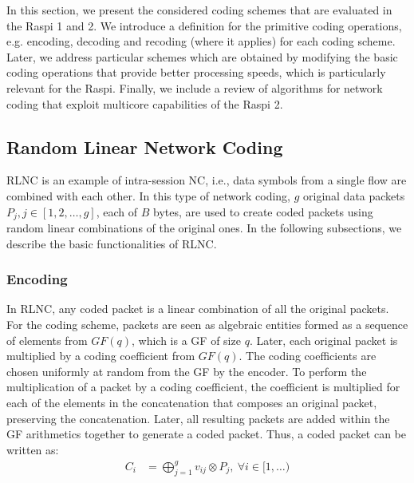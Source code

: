 \label{sec:schemes}

In this section, we present the considered coding schemes that are evaluated
in the \ac{Raspi} 1 and 2.
We introduce a
definition for the primitive coding operations, e.g. encoding,
decoding and recoding (where it applies) for each coding
scheme. Later, we address particular schemes which are obtained by
modifying the basic coding operations that provide better processing
speeds, which is particularly relevant for the \ac{Raspi}.  Finally,
we include a review of algorithms for network coding that exploit
multicore capabilities of the \ac{Raspi} 2.


\subsection{Random Linear Network Coding}
\label{ssec:RLNC}

\ac{RLNC} is an example of intra-session \ac{NC}, i.e., data symbols
from a single flow are combined with each other. In this type of
network coding, $g$ original data packets $P_j, j \in [1,2,\ldots,g]$, each
of $B$ bytes, are used to create coded packets using random linear
combinations of the original ones. In the following subsections, we
describe the basic functionalities of \ac{RLNC}.

\subsubsection{Encoding}
In \ac{RLNC}, any coded packet is a linear combination of all
the original packets. For the coding scheme, packets are seen as
algebraic entities formed as a sequence of elements from $GF(q)$,
which is a \ac{GF} of size $q$. Later, each original packet is
multiplied by a coding coefficient from $GF(q)$. The coding coefficients
are chosen uniformly at random from the \ac{GF} by the encoder. To
perform the multiplication of a packet by a coding coefficient, the
coefficient is multiplied for each of the elements in the
concatenation that composes an original packet, preserving the
concatenation. Later, all resulting packets are added within the
\ac{GF} arithmetics together to generate a coded packet. Thus, a
coded packet can be written as:
%
\begin{align} \label{eq:coded_packet}
C_i  &= \bigoplus_{j=1}^{g} v_{ij} \otimes P_j ,\ \forall i \in [1,\ldots)
\end{align}

